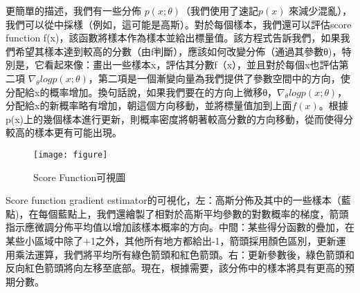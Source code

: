 更簡單的描述，我們有一些分佈 $p(x;\theta)$（我們使用了速記$ p \left( x \right)$ 來減少混亂），我們可以從中採樣（例如，這可能是高斯）。對於每個樣本，我們還可以評估score function f(x)，該函數將樣本作為樣本並給出標量值。該方程式告訴我們，如果我們希望其樣本達到較高的分數（由f判斷），應該如何改變分佈（通過其參數θ)，特別是，它看起來像：畫出一些樣本x，評估其分數f（x），並且對於每個x也評估第二項 $\nabla_\theta logp(x;θ)$，第二項是一個漸變向量為我們提供了參數空間中的方向，使分配給x的概率增加。換句話說，如果我們要在的方向上微移θ，$\nabla_\theta logp(x;θ)$，分配給x的新概率略有增加，朝這個方向移動，並將標量值加到上面$f(x)$。根據p(x)上的幾個樣本進行更新，則概率密度將朝著較高分數的方向移動，從而使得分較高的樣本更有可能出現。\\
\begin{figure}[hbt!]
\begin{center}
\texttt{[image: figure]}
\caption{Score Function可視圖}
\end{center}
\end{figure}

 Score function gradient estimator的可視化，左：高斯分佈及其中的一些樣本（藍點)，在每個藍點上，我們還繪製了相對於高斯平均參數的對數概率的梯度，箭頭指示應微調分佈平均值以增加該樣本概率的方向。中間：某些得分函數的疊加，在某些小區域中除了+1之外，其他所有地方都給出-1，箭頭採用顏色區別，更新運用乘法運算，我們將平均所有綠色箭頭和紅色箭頭。右：更新參數後，綠色箭頭和反向紅色箭頭將向左移至底部。現在，根據需要，該分佈中的樣本將具有更高的預期分數。\\
\fi
\newpage
